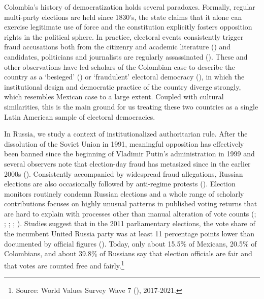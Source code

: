 \documentclass[11pt, ngerman,english,a4]{article}
\begin{document}
Colombia's history of democratization holds several paradoxes. Formally, regular multi-party elections are held since 1830's, the state claims that it alone can exercise legitimate use of force and the constitution explicitly fosters opposition rights in the political sphere. In practice, electoral events consistently trigger fraud accusations both from the citizenry and academic literature (\citealt{DuqueDaza2019}) and candidates, politicians and journalists are regularly assassinated (\citealt{Bejarano2005}). These and other observations have led scholars of the Colombian case to describe the country as a `besieged' (\citealt{Bejarano2005}) or `fraudulent' electoral democracy (\citealt{DuqueDaza2019}), in which the institutional design and democratic practice of the country diverge strongly, which resembles Mexican case to a large extent. Coupled with cultural similarities, this is the main ground for us treating these two countries as a single Latin American sample of electoral democracies. 

In Russia, we study a context of institutionalized authoritarian rule. After the dissolution of the Soviet Union in 1991, meaningful opposition has effectively been banned since the beginning of Vladimir Putin's administration in 1999 and several observers note that election-day fraud has metasized since in the earlier 2000s (\citealt{Myagkov2009}). Consistently accompanied by widespread fraud allegations, Russian elections are also occasionally followed by anti-regime protests (\citealt{Robertson2017, Lankina2020}). 
Election monitors routinely condemn Russian elections and a whole range of scholarly contributions focuses on highly unusual patterns in published voting returns that are hard to explain with processes other than manual alteration of vote counts (\citealt{Rozenas2017}; \citealt{Klimek2012}; \citealt{Myagkov2009}; \citealt{Jimenez2017}; \citealt{Kobak2016a, Kobak2016b, Kobak2018}). Studies suggest that in the 2011 parliamentary elections, the vote share of the incumbent United Russia party was at least 11 percentage points lower than documented by official figures (\citealt{Enikolopov2013}). Today, only about 15.5\% of Mexicans, 20.5\% of Colombians, and about 39.8\% of Russians say that election officials are fair and that votes are counted free and fairly.\footnote{Source: World Values Survey Wave 7 (\citealt{Inglehart2020}), 2017-2021.}
\end{document}
